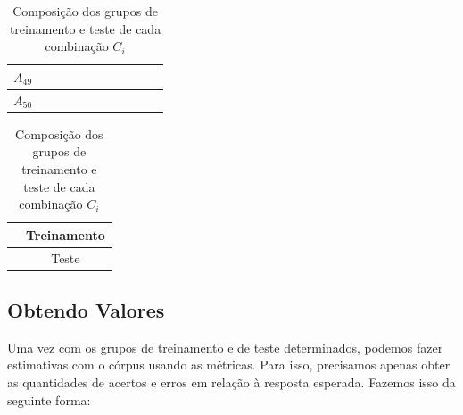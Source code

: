 \documentclass[11pt]{report}
\begin{document}
\begin{table}[h!]
\begin{tabular}{| c | c | c | c | c | c | c | c | c | c | c |}
    \small{$A_{49}$} & \cellcolor{train} & \cellcolor{train} & \cellcolor{train} & \cellcolor{train} & \cellcolor{train} & \cellcolor{train} & \cellcolor{test}  & \cellcolor{train} & \cellcolor{train} &  \cellcolor{train} \\ \hline
    \small{$A_{50}$} & \cellcolor{train} & \cellcolor{train} & \cellcolor{train} & \cellcolor{train} & \cellcolor{train} & \cellcolor{train} & \cellcolor{train} & \cellcolor{train} & \cellcolor{train} &  \cellcolor{train} \\ \hline
  \end{tabular}
  \begin{tabular}{| c | c |}
    \hline
    \cellcolor{train} & Treinamento \\ \hline
    \cellcolor{test} & Teste \\ \hline
  \end{tabular}
  \caption{Composição dos grupos de treinamento e teste de cada combinação $C_i$}
\end{table}

\subsection{Obtendo Valores}

\indent\indent Uma vez com os grupos de treinamento e de teste determinados, podemos fazer estimativas com o córpus usando as métricas. Para isso, precisamos
apenas obter as quantidades de acertos e erros em relação à resposta esperada. Fazemos isso da seguinte forma:
\end{document}
